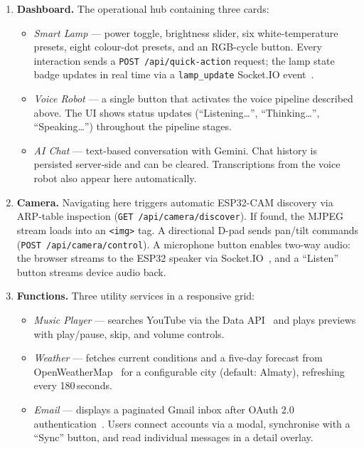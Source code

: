 \begin{enumerate}
    \item \textbf{Dashboard.} The operational hub containing three cards:
    \begin{itemize}
        \item \textit{Smart Lamp} --- power toggle, brightness slider, six white-temperature presets, eight colour-dot presets, and an RGB-cycle button. Every interaction sends a \texttt{POST /api/quick-action} request; the lamp state badge updates in real time via a \texttt{lamp\_update} Socket.IO event~\cite{flask-socketio}.
        \item \textit{Voice Robot} --- a single button that activates the voice pipeline described above. The UI shows status updates (``Listening\ldots'', ``Thinking\ldots'', ``Speaking\ldots'') throughout the pipeline stages.
        \item \textit{AI Chat} --- text-based conversation with Gemini. Chat history is persisted server-side and can be cleared. Transcriptions from the voice robot also appear here automatically.
    \end{itemize}

    \item \textbf{Camera.} Navigating here triggers automatic ESP32-CAM discovery via ARP-table inspection (\texttt{GET /api/camera/discover}). If found, the MJPEG stream loads into an \texttt{<img>} tag. A directional D-pad sends pan/tilt commands (\texttt{POST /api/camera/control}). A microphone button enables two-way audio: the browser streams to the ESP32 speaker via Socket.IO~\cite{socketio}, and a ``Listen'' button streams device audio back.

    \item \textbf{Functions.} Three utility services in a responsive grid:
    \begin{itemize}
        \item \textit{Music Player} --- searches YouTube via the Data API~\cite{youtube-api} and plays previews with play/pause, skip, and volume controls.
        \item \textit{Weather} --- fetches current conditions and a five-day forecast from OpenWeatherMap~\cite{openweather} for a configurable city (default: Almaty), refreshing every 180\,seconds.
        \item \textit{Email} --- displays a paginated Gmail inbox after OAuth 2.0 authentication~\cite{google-oauth,rfc6749}. Users connect accounts via a modal, synchronise with a ``Sync'' button, and read individual messages in a detail overlay.
    \end{itemize}


\end{enumerate}
